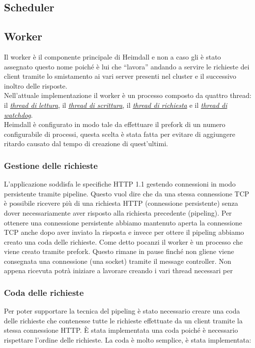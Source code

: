\documentclass[italian]{tktltiki2}
\begin{document}
\subsection{Scheduler}

\subsection{Worker}
Il worker è il componente principale di Heimdall e non a caso gli è stato assegnato questo nome poiché è lui che ``lavora'' andando a servire le richieste dei client tramite lo smistamento ai vari server presenti nel cluster e il successivo inoltro delle risposte.
\\
Nell'attuale implementazione il worker è un processo composto da quattro thread: il \hyperref[sec:reader]{\emph{thread di lettura}}, il \hyperref[sec:writer]{\emph{thread di scrittura}}, il \hyperref[sec:request]{\emph{thread di richiesta}} e il \hyperref[sec:watchdog]{\emph{thread di watchdog}}.
\\
Heimdall è configurato in modo tale da effettuare il prefork di un numero configurabile di processi, questa scelta è stata fatta per evitare di aggiungere ritardo causato dal tempo di creazione di quest'ultimi.

\subsubsection{Gestione delle richieste}
L'applicazione soddisfa le specifiche HTTP 1.1 gestendo connessioni in modo persistente tramite pipeline. Questo vuol dire che da una stessa connessione TCP è possibile ricevere più di una richiesta HTTP (connessione persistente) senza dover necessariamente aver risposto alla richiesta precedente (pipeling). Per ottenere una connessione persistente abbiamo mantenuto aperta la connessione TCP anche dopo aver inviato la risposta e invece per ottere il pipeling abbiamo creato una coda delle richieste. 
Come detto pocanzi il worker è un processo che viene creato tramite prefork. Questo rimane in pause finché non gliene viene consegnata una connessione (una socket) tramite il message controller. Non appena ricevuta potrà iniziare a lavorare creando i vari thread necessari per 
\subsubsection*{Coda delle richieste}
Per poter supportare la tecnica del pipeling è stato necessario creare una coda delle richieste che contenesse tutte le richieste effettuate da un client tramite la stessa connessione HTTP. È stata implementata una coda poiché è necessario rispettare l'ordine delle richieste. 
La coda è molto semplice, è stata implementata:
\end{document}
